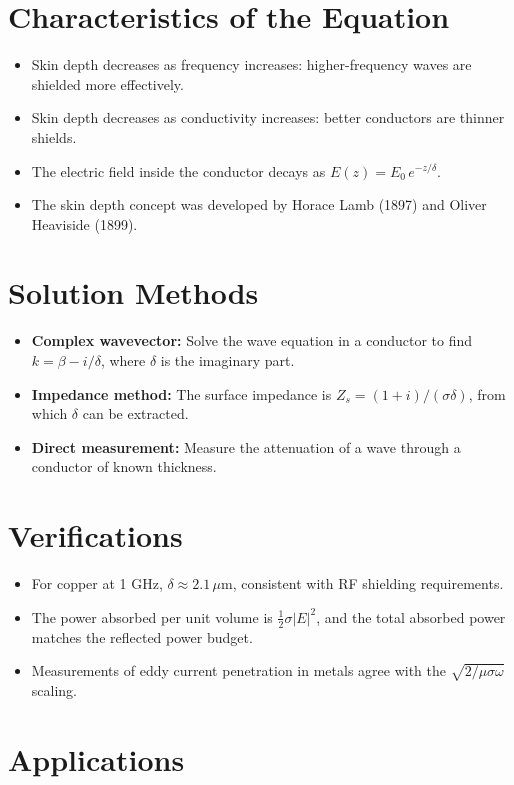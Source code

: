 \section*{Characteristics of the Equation}

\begin{itemize}
    \item Skin depth decreases as frequency increases: higher-frequency waves are shielded more effectively.
    \item Skin depth decreases as conductivity increases: better conductors are thinner shields.
    \item The electric field inside the conductor decays as $E(z) = E_0\,e^{-z/\delta}$.
    \item The skin depth concept was developed by Horace Lamb (1897) and Oliver Heaviside (1899).
\end{itemize}
\section*{Solution Methods}

\begin{itemize}
    \item \textbf{Complex wavevector:} Solve the wave equation in a conductor to find $k = \beta - i/\delta$, where $\delta$ is the imaginary part.
    \item \textbf{Impedance method:} The surface impedance is $Z_s = (1+i)/(\sigma\delta)$, from which $\delta$ can be extracted.
    \item \textbf{Direct measurement:} Measure the attenuation of a wave through a conductor of known thickness.
\end{itemize}
\section*{Verifications}

\begin{itemize}
    \item For copper at 1 GHz, $\delta \approx 2.1\,\mu$m, consistent with RF shielding requirements.
    \item The power absorbed per unit volume is $\frac{1}{2}\sigma|E|^2$, and the total absorbed power matches the reflected power budget.
    \item Measurements of eddy current penetration in metals agree with the $\sqrt{2/\mu\sigma\omega}$ scaling.
\end{itemize}
\section*{Applications}

